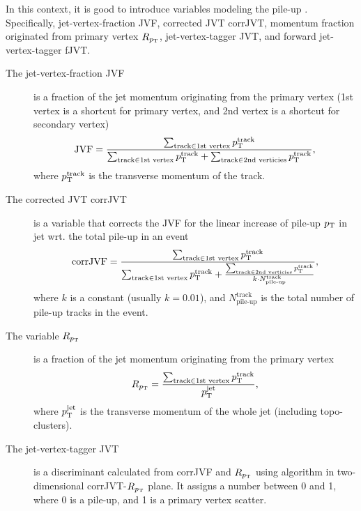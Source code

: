 In this context, it is good to introduce variables modeling the pile-up \cite{jvt}.
Specifically, jet-vertex-fraction JVF, corrected JVT corrJVT, momentum fraction originated from primary vertex $R_{p_\text{T}}$, jet-vertex-tagger JVT, and forward jet-vertex-tagger fJVT.
\begin{description}
     
    \item[The jet-vertex-fraction JVF] is a fraction of the jet  momentum originating from the primary vertex (1st vertex is a shortcut for primary vertex, and 2nd vertex is a shortcut for secondary vertex)
    \begin{equation}
        \label{eq:jvf}
    \text{JVF} = \frac{\sum_{\text{track} \in \text{1st vertex}} p_\text{T}^{\text{track}}}{\sum_{\text{track} \in \text{1st vertex}} p_\text{T}^{\text{track}} + \sum_{\text{track} \in \text{2nd verticies}} p_\text{T}^{\text{track}}},
    \end{equation}
    where $p_\text{T}^{\text{track}}$ is the transverse momentum of the track. 
    
    \item[The corrected JVT corrJVT] is a variable that corrects the JVF for the linear increase of pile-up $p_\text{T}$ in jet wrt. the total pile-up in an event
    \begin{equation}
        \label{eq:corr_jvf}
        \text{corrJVF} = \frac{\sum_{\text{track} \in \text{1st vertex}} p_\text{T}^{\text{track}}}{\sum_{\text{track} \in \text{1st vertex}} p_\text{T}^{\text{track}} + \frac{\sum_{\text{track} \in \text{2nd verticies}} p_\text{T}^{\text{track}}}{k\cdot N^{\text{track}}_{\text{pile-up}}}},
    \end{equation}
    where $k$ is a constant (usually $k=0.01$), and $N^{\text{track}}_{\text{pile-up}}$ is the total number of pile-up tracks in the event.
    
    
    \item[The variable $R_{p_\text{T}}$] is a fraction of the  jet momentum originating from the primary vertex
    \begin{equation}
        \label{eq:rpt}
        R_{p_\text{T}} = \frac{\sum_{\text{track} \in \text{1st vertex}} p_\text{T}^{\text{track}}}{p_\text{T}^{\text{jet}}},
    \end{equation}
    where $p_\text{T}^{\text{jet}}$ is the transverse momentum of the whole jet (including topo-clusters).

    \item[The jet-vertex-tagger JVT] is a discriminant calculated from corrJVF and $R_{p_\text{T}}$ using \kNN algorithm in two-dimensional corrJVT-$R_{p_\text{T}}$ plane. 
    It assigns a number between 0 and 1, where 0 is a pile-up, and 1 is a primary vertex scatter.


\end{description}
